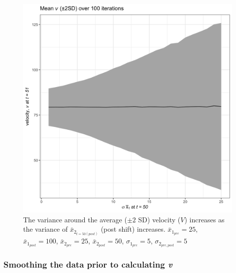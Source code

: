 \documentclass[print]{nuthesis}
\begin{document}
\begin{figure}
\includegraphics[width=0.85\linewidth]{./chapterFiles/velocity/figsCalledInDiss/simVarPlot2} \caption{The variance around the average ($\pm2$ SD) velocity ($V$) increases as the variance of $\bar{x}_{2_{t=50 (post)}}$ (post shift) increases. $\bar{x}_{1_{pre}} = 25$, $\bar{x}_{1_{post}} = 100$, $\bar{x}_{2_{pre}} = 25$, $\bar{x}_{2_{post}} = 50$, $\sigma_{1_{pre}} = 5$, $\sigma_{2_{pre,post}} = 5$}\label{fig:simVarPlot2}
\end{figure}
\hypertarget{smoothing-the-data-prior-to-calculating-v}{%
\subsubsection{\texorpdfstring{Smoothing the data prior to calculating \emph{v}}{Smoothing the data prior to calculating v}}\label{smoothing-the-data-prior-to-calculating-v}}
\end{document}
